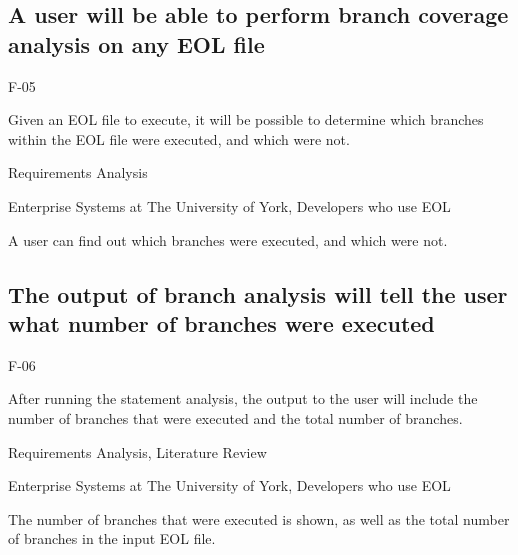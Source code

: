 \subsection{A user will be able to perform branch coverage analysis on any EOL file}
\begin{description}[style=sameline,leftmargin=4.5cm,nolistsep]
\item[\hspace*{0.3cm}Label] F-05
\item[\hspace*{0.3cm}Description] Given an EOL file to execute, it will be possible to determine which branches within the EOL file were executed, and which were not.
\item[\hspace*{0.3cm}Source] Requirements Analysis
\item[\hspace*{0.3cm}Stakeholders] Enterprise Systems at The University of York, Developers who use EOL
\item[\hspace*{0.3cm}Satisfiable Conditions] A user can find out which branches were executed, and which were not.
\end{description}

\subsection{The output of branch analysis will tell the user what number of branches were executed}
\begin{description}[style=sameline,leftmargin=4.5cm,nolistsep]
\item[\hspace*{0.3cm}Label] F-06
\item[\hspace*{0.3cm}Description] After running the statement analysis, the output to the user will include the number of branches that were executed and the total number of branches.
\item[\hspace*{0.3cm}Source] Requirements Analysis, Literature Review
\item[\hspace*{0.3cm}Stakeholders] Enterprise Systems at The University of York, Developers who use EOL
\item[\hspace*{0.3cm}Satisfiable Conditions] The number of branches that were executed is shown, as well as the total number of branches in the input EOL file.
\end{description}

